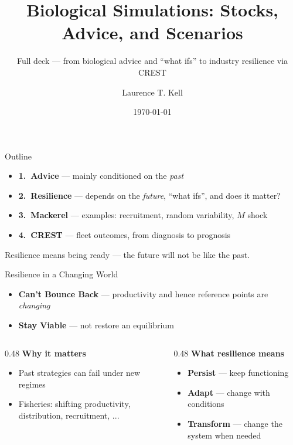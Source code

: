 \documentclass[12pt,aspectratio=169]{beamer}
\title[BIM Resilience --- full]{Biological Simulations: Stocks, Advice, and Scenarios}
\subtitle{Full deck --- from biological advice and ``what ifs'' to industry resilience via CREST}
\author{Laurence T. Kell}
\institute{BIM Resilience Project}
\date{\today}
\begin{document}

\begin{frame}{Outline}
  \begin{itemize}
    \item \textbf{1.\ Advice} --- mainly conditioned on the \emph{past}
    \item \textbf{2.\ Resilience} --- depends on the \emph{future}, ``what ifs'', and does it matter?
    \item \textbf{3.\ Mackerel} --- examples: recruitment, random variability, $M$ shock
    \item \textbf{4.\ CREST} --- fleet outcomes, from diagnosis to prognosis
  \end{itemize}
  \vspace{4mm}
  {\footnotesize\textcolor{bimsteel}{Resilience means being ready --- the future will not be like the past.}}
\end{frame}


\begin{frame}{Resilience in a Changing World}
	\footnotesize
	\begin{itemize}
		\item \textbf{Can't Bounce Back} --- productivity and hence reference points are \emph{changing}
		\item \textbf{Stay Viable} --- not restore an equilibrium
	\end{itemize}
	\vspace{2mm}
	\begin{columns}[T]
		\begin{column}{0.48\textwidth}
			\textbf{Why it matters}
			\begin{itemize}
				\item Past strategies can fail under new regimes
				\item Fisheries: shifting productivity, distribution, recruitment, ...
			\end{itemize}
		\end{column}
		\begin{column}{0.48\textwidth}
			\textbf{What resilience means}
			\begin{itemize}
				\item \textbf{Persist} --- keep functioning
				\item \textbf{Adapt} --- change with conditions
				\item \textbf{Transform} --- change the system when needed
			\end{itemize}
		\end{column}
	\end{columns}
\end{frame}
\end{document}
